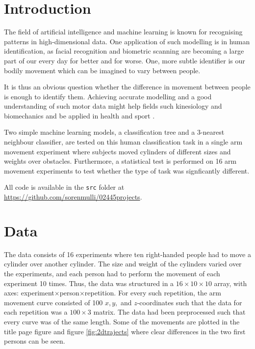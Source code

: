 \documentclass[11pt,fleqn]{article}
\begin{document}
\section{Introduction}
The field of artificial intelligence and machine learning is known for recognising patterns in high-dimensional data. 
One application of such modelling is in human identification, as facial recognition and biometric scanning are becoming a large part of our every day for better and for worse. One, more subtle identifier is our bodily movement which can be imagined to vary between people.

It is thus an obvious question whether the difference in movement between people is enough to identify them. Achieving accurate modelling and a good understanding of such motor data might help fields such kinesiology and biomechanics and be applied in health and sport \cite{kine}.

Two simple machine learning models, a classification tree and a 3-nearest neighbour classifier, are tested on this human classification task in a single arm movement experiment where subjects moved cylinders of different sizes and weights over obstacles. Furthermore, a statistical test is performed on 16 arm movement experiments to test whether the type of task was signficantly different.

All code is available in the \texttt{src} folder at \url{https://github.com/sorenmulli/02445projects}.

\section{Data}
The data consists of 16 experiments where ten right-handed people had to move a cylinder over another cylinder.
The size and weight of the cylinders varied over the experiments, and each person had to perform the movement of each experiment 10 times.
Thus, the data was structured in a $ 16\times 10\times 10 $ array, with axes: experiment\(\times\)person\(\times\)repetition.
For every such repetition, the arm movement curve consisted of 100 $ x, y, $ and $ z $-coordinates such that the data for each repetition was a $ 100\times 3 $ matrix.
The data had been preprocessed such that every curve was of the same length.
Some of the movements are plotted in the title page figure  and figure \ref{fig:2dtrajects} where clear differences in the two first persons can be seen.
\end{document}
